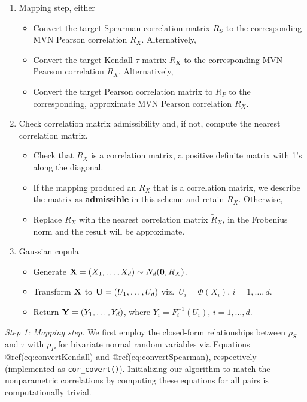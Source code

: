 \documentclass{article}
\begin{document}
\begin{enumerate}
\def\labelenumi{\arabic{enumi}.}
\tightlist
\item
  Mapping step, either

  \begin{itemize}
  \tightlist
  \item
    Convert the target Spearman correlation matrix \(R_S\) to the
    corresponding MVN Pearson correlation \(R_X\). Alternatively,
  \item
    Convert the target Kendall \(\tau\) matrix \(R_K\) to the
    corresponding MVN Pearson correlation \(R_X\). Alternatively,
  \item
    Convert the target Pearson correlation matrix to \(R_P\) to the
    corresponding, approximate MVN Pearson correlation \(R_X\).
  \end{itemize}
\item
  Check correlation matrix admissibility and, if not, compute the
  nearest correlation matrix.

  \begin{itemize}
  \tightlist
  \item
    Check that \(R_X\) is a correlation matrix, a positive definite
    matrix with 1's along the diagonal.
  \item
    If the mapping produced an \(R_X\) that is a correlation matrix, we
    describe the matrix as \textbf{admissible} in this scheme and retain
    \(R_X\). Otherwise,
  \item
    Replace \(R_X\) with the nearest correlation matrix \(\tilde{R}_X\),
    in the Frobenius norm and the result will be approximate.
  \end{itemize}
\item
  Gaussian copula

  \begin{itemize}
  \tightlist
  \item
    Generate \({\bf X}=(X_1, \ldots, X_d) \sim N_d({\bf 0}, R_X)\).
  \item
    Transform \({\bf X}\) to \({\bf U} = (U_1, \ldots, U_d)\)
    viz.~\(U_i=\Phi(X_i)\), \(i=1, \ldots, d\).
  \item
    Return \({\bf Y} = (Y_1, \ldots, Y_d)\), where
    \(Y_i=F_i^{-1}(U_i)\), \(i=1, \ldots, d\).
  \end{itemize}
\end{enumerate}

\emph{Step 1: Mapping step.} We first employ the closed-form
relationships between \(\rho_S\) and \(\tau\) with \(\rho_P\) for
bivariate normal random variables via Equations @ref(eq:convertKendall)
and @ref(eq:convertSpearman), respectively (implemented as
\texttt{cor\_covert()}). Initializing our algorithm to match the
nonparametric correlations by computing these equations for all pairs is
computationally trivial.
\end{document}
